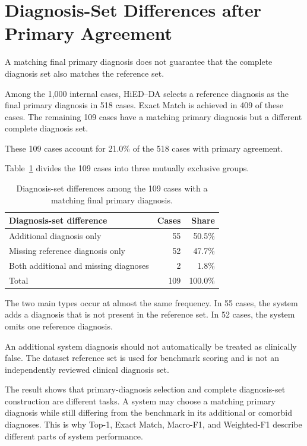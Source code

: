 \documentclass[12pt,a4paper,oneside]{report}
\begin{document}
\section{Diagnosis-Set Differences after Primary Agreement}
\label{sec:ch8-diagnostic-set}

A matching final primary diagnosis does not guarantee that the complete
diagnosis set also matches the reference set.

Among the 1,000 internal cases, HiED--DA selects a reference diagnosis as
the final primary diagnosis in 518 cases. Exact Match is achieved in 409
of these cases. The remaining 109 cases have a matching primary
diagnosis but a different complete diagnosis set.

These 109 cases account for 21.0\% of the 518 cases with primary
agreement.

Table~\ref{tab:ch8-diagnostic-set-errors} divides the 109 cases into
three mutually exclusive groups.

\begin{table}[htbp]
\centering
\caption{Diagnosis-set differences among the 109 cases with a matching
final primary diagnosis.}
\label{tab:ch8-diagnostic-set-errors}
\small
\renewcommand{\arraystretch}{1.12}
\begin{tabularx}{\textwidth}
{|>{\raggedright\arraybackslash}X|r|r|}
\hline
\textbf{Diagnosis-set difference} &
\textbf{Cases} &
\textbf{Share}\\
\hline
Additional diagnosis only &
55 &
50.5\%\\
\hline
Missing reference diagnosis only &
52 &
47.7\%\\
\hline
Both additional and missing diagnoses &
2 &
1.8\%\\
\hline
Total &
109 &
100.0\%\\
\hline
\end{tabularx}
\renewcommand{\arraystretch}{1.0}
\end{table}

The two main types occur at almost the same frequency. In 55 cases, the
system adds a diagnosis that is not present in the reference set. In 52
cases, the system omits one reference diagnosis.

An additional system diagnosis should not automatically be treated as
clinically false. The dataset reference set is used for benchmark
scoring and is not an independently reviewed clinical diagnosis set.

The result shows that primary-diagnosis selection and complete
diagnosis-set construction are different tasks. A system may choose a
matching primary diagnosis while still differing from the benchmark in
its additional or comorbid diagnoses. This is why Top-1, Exact Match,
Macro-F1, and Weighted-F1 describe different parts of system
performance.
\end{document}
